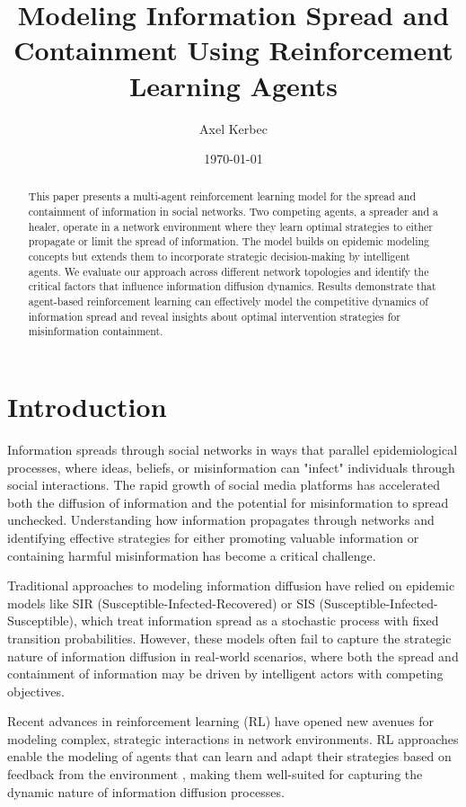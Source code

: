 \documentclass[12pt]{article}
\title{Modeling Information Spread and Containment Using Reinforcement Learning Agents}
\author{Axel Kerbec}
\date{\today}
\begin{document}
\maketitle

\begin{abstract}
This paper presents a multi-agent reinforcement learning model for the spread and containment of information in social networks. Two competing agents, a spreader and a healer, operate in a network environment where they learn optimal strategies to either propagate or limit the spread of information. The model builds on epidemic modeling concepts but extends them to incorporate strategic decision-making by intelligent agents. We evaluate our approach across different network topologies and identify the critical factors that influence information diffusion dynamics. Results demonstrate that agent-based reinforcement learning can effectively model the competitive dynamics of information spread and reveal insights about optimal intervention strategies for misinformation containment.
\end{abstract}

\section{Introduction}

Information spreads through social networks in ways that parallel epidemiological processes, where ideas, beliefs, or misinformation can "infect" individuals through social interactions. The rapid growth of social media platforms has accelerated both the diffusion of information and the potential for misinformation to spread unchecked. Understanding how information propagates through networks and identifying effective strategies for either promoting valuable information or containing harmful misinformation has become a critical challenge.

Traditional approaches to modeling information diffusion have relied on epidemic models like SIR (Susceptible-Infected-Recovered) or SIS (Susceptible-Infected-Susceptible), which treat information spread as a stochastic process with fixed transition probabilities. However, these models often fail to capture the strategic nature of information diffusion in real-world scenarios, where both the spread and containment of information may be driven by intelligent actors with competing objectives.

Recent advances in reinforcement learning (RL) have opened new avenues for modeling complex, strategic interactions in network environments. RL approaches enable the modeling of agents that can learn and adapt their strategies based on feedback from the environment \citep{sutton2018reinforcement}, making them well-suited for capturing the dynamic nature of information diffusion processes.
\end{document}
